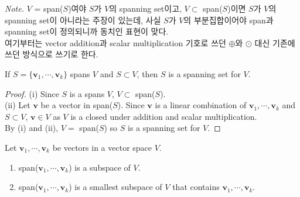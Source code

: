 \textit{Note.} $V$ = span($S$)여야 $S$가 $V$의 spanning set이고, $V \subset$ span($S$)이면 $S$가 $V$의 spanning set이 아니라는 주장이 있는데, 사실 $S$가 $V$의 부분집합이어야 span과 spanning set이 정의되니까 동치인 표현이 맞다. \\

여기부터는 vector addition과 scalar multiplication 기호로 쓰던 $\oplus$와 $\odot$ 대신 기존에 쓰던 방식으로 쓰기로 한다.

\begin{plaintheorem}
	If $S = \{ \textbf{v}_1, \cdots, \textbf{v}_k \}$ spans $V$ and $S \subset V$, then $S$ is a spanning set for $V$.
\end{plaintheorem}

\begin{proof}
	(i) Since $S$ is a spans $V$, $V \subset $ span($S$). \\
	
	(ii) Let $\textbf{v}$ be a vector in span($S$). Since $\textbf{v}$ is a linear combination of $\textbf{v}_1, \cdots, \textbf{v}_k$ and $S \subset V$, $\textbf{v} \in V$ as $V$ is a closed under addition and scalar multiplication. \\
	
	By (i) and (ii),  $V =$ span($S$) so $S$ is a spanning  set for $V$.
\end{proof}

\begin{theorem}
	Let $\textbf{v}_1, \cdots, \textbf{v}_k$ be vectors in a vector space $V$.
	\begin{enumerate}
		\item span($\textbf{v}_1, \cdots, \textbf{v}_k$) is a subspace of $V$.
		\item span($\textbf{v}_1, \cdots, \textbf{v}_k$) is a smallest subspace of $V$ that contains $\textbf{v}_1, \cdots, \textbf{v}_k$.
	\end{enumerate}
\end{theorem}

